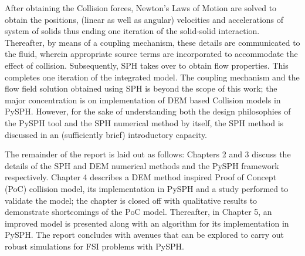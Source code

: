 After obtaining the Collision forces, Newton's Laws of Motion are solved to obtain the positions, (linear as well as angular) velocities and accelerations of system of solids thus ending one iteration of the solid-solid interaction. Thereafter, by means of a coupling mechanism, these details are communicated to the fluid, wherein appropriate source terms are incorporated to accommodate the effect of collision. Subsequently, SPH takes over to obtain flow properties. This completes one iteration of the integrated model. The coupling mechanism and the flow field solution obtained using SPH is beyond the scope of this work; the major concentration is on implementation of DEM based Collision models in PySPH. However, for the sake of understanding both the design philosophies of the PySPH tool and the SPH numerical method by itself, the SPH method is discussed in an (sufficiently brief) introductory capacity.

The remainder of the report is laid out as follows: Chapters 2 and 3 discuss the details of the SPH and DEM numerical methods and the PySPH framework respectively. Chapter 4 describes a DEM method inspired Proof of Concept (PoC) collision model, its implementation in PySPH and a study performed to validate the model; the chapter is closed off with qualitative results to demonstrate shortcomings of the PoC model. Thereafter, in Chapter 5, an improved model is presented along with an algorithm for its implementation in PySPH. The report concludes with avenues that can be explored to carry out robust simulations for FSI problems with PySPH.